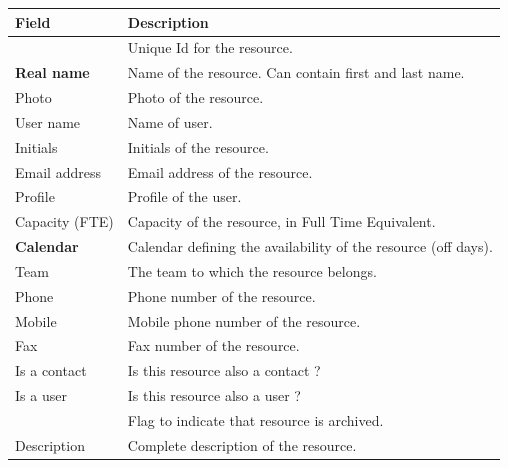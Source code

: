 \documentclass[letterpaper,10pt,english]{sphinxmanual}
\begin{document}
\begin{tabulary}{\linewidth}{|l|l|}
\hline
\textsf{\relax 
Field
} & \textsf{\relax 
Description
}\\
\hline
{\hyperref[Glossary:term-id]{\emph{}}}
 & 
Unique Id for the resource.
\\
\hline
\textbf{Real name}
 & 
Name of the resource. Can contain first and last name.
\\
\hline
Photo
 & 
Photo of the resource.
\\
\hline
User name
 & 
Name of user.
\\
\hline
Initials
 & 
Initials of the resource.
\\
\hline
Email address
 & 
Email address of the resource.
\\
\hline
Profile
 & 
Profile of the user.
\\
\hline
Capacity (FTE)
 & 
Capacity of the resource, in Full Time Equivalent.
\\
\hline
\textbf{Calendar}
 & 
Calendar defining the availability of the resource (off days).
\\
\hline
Team
 & 
The team to which the resource belongs.
\\
\hline
Phone
 & 
Phone number of the resource.
\\
\hline
Mobile
 & 
Mobile phone number of the resource.
\\
\hline
Fax
 & 
Fax number of the resource.
\\
\hline
Is a contact
 & 
Is this resource also a contact ?
\\
\hline
Is a user
 & 
Is this resource also a user ?
\\
\hline
{\hyperref[Glossary:term-closed]{\emph{}}}
 & 
Flag to indicate that resource is archived.
\\
\hline
Description
 & 
Complete description of the resource.
\\
\hline\end{tabulary}
\end{document}
